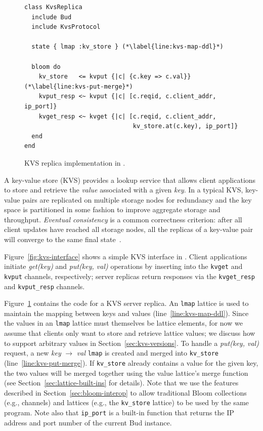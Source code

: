 \begin{figure}[t]
\begin{scriptsize}
\begin{lstlisting}
class KvsReplica
  include Bud
  include KvsProtocol

  state { lmap :kv_store } (*\label{line:kvs-map-ddl}*)

  bloom do
    kv_store   <= kvput {|c| {c.key => c.val}} (*\label{line:kvs-put-merge}*)
    kvput_resp <~ kvput {|c| [c.reqid, c.client_addr, ip_port]}
    kvget_resp <~ kvget {|c| [c.reqid, c.client_addr,
                              kv_store.at(c.key), ip_port]}
  end
end
\end{lstlisting}
\end{scriptsize}
\caption{KVS replica implementation in \lang.}
\label{fig:kvs-replica}
\end{figure}

A key-value store (KVS) provides a lookup service that allows client
applications to store and retrieve the \emph{value} associated with a given
\emph{key}. In a typical KVS, key-value pairs are replicated on multiple storage
nodes for redundancy and the key space is partitioned in some fashion to improve
aggregate storage and throughput. \emph{Eventual consistency} is a common
correctness criterion: after all client updates have reached all storage nodes,
all the replicas of a key-value pair will converge to the same final
state~\cite{Terry1995,vogels}.

Figure~\ref{fig:kvs-interface} shows a simple KVS interface in \lang. Client
applications initiate \emph{get(key)} and \emph{put(key, val)} operations by
inserting into the \texttt{kvget} and \texttt{kvput} channels, respectively;
server replicas return responses via the \texttt{kvget\_resp} and
\texttt{kvput\_resp} channels.

Figure~\ref{fig:kvs-replica} contains the \lang code for a KVS server
replica. An \texttt{lmap} lattice is used to maintain the mapping between keys
and values (line~\ref{line:kvs-map-ddl}). Since the values in an \texttt{lmap}
lattice must themselves be lattice elements, for now we assume that clients only
want to store and retrieve lattice values; we discuss how to support arbitrary
values in Section~\ref{sec:kvs-versions}. To handle a \emph{put(key, val)}
request, a new \emph{key} $\to$ \emph{val} \texttt{lmap} is created and merged
into \texttt{kv\_store} (line~\ref{line:kvs-put-merge}). If \texttt{kv\_store}
already contains a value for the given key, the two values will be merged
together using the value lattice's merge function (see
Section~\ref{sec:lattice-built-ins} for details). Note that we use the \lang
features described in Section~\ref{sec:bloom-interop} to allow traditional Bloom
collections (e.g., channels) and lattices (e.g., the \texttt{kv\_store} lattice)
to be used by the same program. Note also that \texttt{ip\_port} is a built-in
function that returns the IP address and port number of the current Bud
instance.

